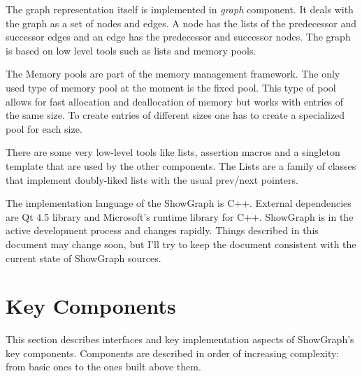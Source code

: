 \documentclass[11pt,a4paper]{article}
\begin{document}
The graph representation itself is implemented in \emph{graph} component. It deals with the graph as a set of nodes and edges. A node has the lists of the predecessor and successor edges and an edge has the predecessor and successor nodes. The graph is based on low level tools such as lists and memory pools.

The Memory pools are part of the memory management framework. The only used type of memory pool at the moment is the fixed pool. This type of pool allows for fast allocation and deallocation of memory but works with entries of the same size. To create entries of different sizes one has to create a specialized pool for each size.

There are some very low-level tools like lists, assertion macros and a singleton template that are used by the other components. The Lists are a family of classes that implement doubly-liked lists with the usual prev/next pointers. 

The implementation language of the ShowGraph is C++. External dependencies are Qt 4.5 library and Microsoft's runtime library for C++. ShowGraph is in the active development process and changes rapidly. Things described in this document may change soon, but I'll try to keep the document consistent with the current state of ShowGraph sources.

\section{Key Components}
This section describes interfaces and key implementation aspects of ShowGraph's key components. Components are described in order of increasing complexity: from basic ones to the ones built above them.
\end{document}
